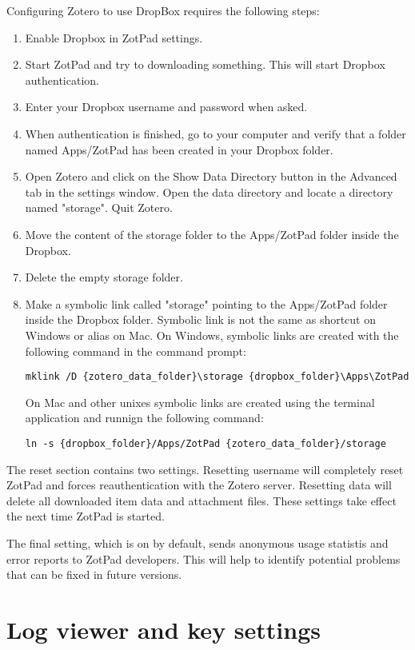 \documentclass[oneside, openany, 12pt]{tufte-book}
\begin{document}
Configuring Zotero to use DropBox requires the following steps:
\begin{enumerate}
\item Enable Dropbox in ZotPad settings.
\item Start ZotPad and try to downloading something. This will start Dropbox authentication.
\item Enter your Dropbox username and password when asked.
\item When authentication is finished, go to your computer and verify that a folder named Apps/ZotPad has been created in your Dropbox folder.
\item Open Zotero and click on the Show Data Directory button in the Advanced tab in the settings window. Open the data directory and locate a directory named "storage". Quit Zotero.
\item Move the content of the storage folder to the Apps/ZotPad folder inside the Dropbox.
\item Delete the empty storage folder.
\item Make a symbolic link called "storage" pointing to the Apps/ZotPad folder inside the Dropbox folder. Symbolic link is not the same as shortcut on Windows or alias on Mac. On Windows, symbolic links are created with the following command in the command prompt:
{\small
\begin{verbatim}
mklink /D {zotero_data_folder}\storage {dropbox_folder}\Apps\ZotPad
\end{verbatim}
}
On Mac and other unixes symbolic links are created using the terminal application and runnign the following command:
{\small
\begin{verbatim}
ln -s {dropbox_folder}/Apps/ZotPad {zotero_data_folder}/storage
\end{verbatim}
}

\end{enumerate}

The reset section contains two settings. Resetting username will completely reset ZotPad and forces reauthentication with the Zotero server. Resetting data will delete all downloaded item data and attachment files. These settings take effect the next time ZotPad is started.

The final setting, which is on by default, sends anonymous usage statistis and error reports to ZotPad developers. This will help to identify potential problems that can be fixed in future versions.

\section{Log viewer and key settings}
\end{document}
